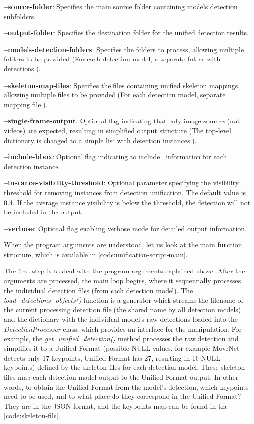 \startitemize
 \item {\bf --source-folder}: Specifies the main source folder containing models detection subfolders.
 \item {\bf --output-folder}: Specifies the destination folder for the unified detection results.
 \item {\bf --models-detection-folders}: Specifies the folders to process, allowing multiple folders to be provided (For each detection model, a separate folder with detections.).
 \item {\bf --skeleton-map-files}: Specifies the files containing unified skeleton mappings, allowing multiple files to be provided (For each detection model, separate mapping file.).
 \item {\bf --single-frame-output}: Optional flag indicating that only image sources (not videos) are expected, resulting in simplified output structure (The top-level dictionary is changed to a simple list with detection instances.).
 \item {\bf --include-bbox}: Optional flag indicating to include \BBOX\ information for each detection instance.
 \item {\bf --instance-visibility-threshold}: Optional parameter specifying the visibility threshold for removing instances from detection unification. The default value is 0.4. If the average instance visibility is below the threshold, the detection will not be included in the output.
 \item {\bf --verbose}: Optional flag enabling verbose mode for detailed output information.
\stopitemize

When the program arguments are understood, let us look at the main function structure, which is available in [code:unification-script-main].


The first step is to deal with the program arguments explained above. After the arguments are processed, the main loop begins, where it sequentially processes the individual detection files (from each detection model). The {\it load_detections_objects()} function is a generator which streams the filename of the current processing detection file (the shared name by all detection models) and the dictionary with the individual model's raw detections loaded into the {\it DetectionProcessor} class, which provides an interface for the manipulation. For example, the {\it get_unified_detection()} method processes the raw detection and simplifies it to a Unified Format (possible NULL values, for example MoveNet detects only 17 keypoints, Unified Format has 27, resulting in 10 NULL keypoints) defined by the skeleton files for each detection model. These skeleton files map each detection model output to the Unified Format output. In other words, to obtain the Unified Format from the model's detection, which keypoints need to be used, and to what place do they correspond in the Unified Format? They are in the JSON format, and the keypoints map can be found in the [code:skeleton-file].

